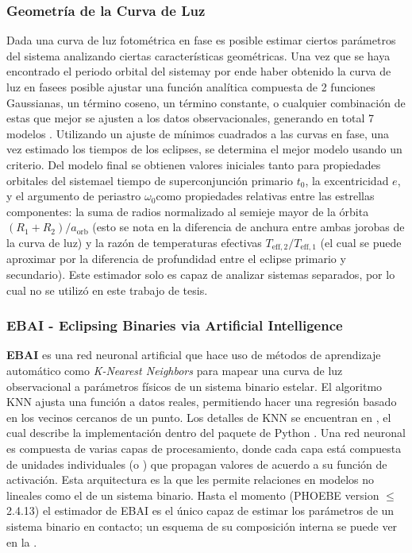 \subsubsection{Geometría de la Curva de Luz}
Dada una curva de luz fotométrica en fase es posible estimar ciertos parámetros
del sistema analizando ciertas características geométricas. Una vez que
se haya encontrado el periodo orbital del sistema\textemdash y por ende haber
obtenido la curva de luz en fase\textemdash es posible ajustar una función
analítica compuesta de 2 funciones Gaussianas, un término coseno, un término
constante, o cualquier combinación de estas que mejor se ajusten a los datos
observacionales, generando en total 7 modelos
. Utilizando un
ajuste de mínimos cuadrados a las curvas en fase, una vez estimado los tiempos
de los eclipses, se determina el mejor modelo usando un criterio. Del modelo
final se obtienen valores iniciales tanto para propiedades orbitales del
sistema\textemdash el tiempo de superconjunción primario $t_0$, la excentricidad
$e$, y el argumento de periastro $\omega_0$\textemdash como propiedades
relativas entre las estrellas componentes: la suma de radios normalizado al
semieje mayor de la órbita $(R_1 + R_2)/a_{\mathrm{orb}}$ (esto se nota en la
diferencia de anchura entre ambas jorobas de la curva de luz) y la razón de
temperaturas efectivas $T_{\mathrm{eff},2}/T_{\mathrm{eff},1}$ (el cual se puede
aproximar por la diferencia de profundidad entre el eclipse primario y
secundario). Este estimador solo es capaz de analizar sistemas separados, por lo
cual no se utilizó en este trabajo de tesis.

\subsubsection{EBAI - Eclipsing Binaries via Artificial Intelligence}
\textbf{EBAI} es una red neuronal artificial que hace uso de métodos de
aprendizaje automático como \textit{K-Nearest Neighbors} para mapear una curva
de luz observacional a parámetros físicos de un sistema binario estelar. El
algoritmo KNN ajusta una función a datos reales, permitiendo hacer una regresión
basado en los vecinos cercanos de un punto. Los detalles de KNN se encuentran en
, el cual describe la implementación
dentro del paquete de Python . Una red neuronal es compuesta
de varias capas de procesamiento, donde cada capa está compuesta de unidades
individuales (o ) que propagan valores de acuerdo a su función
de activación. Esta arquitectura es la que les permite 
relaciones en modelos no lineales como el de un sistema binario. Hasta el
momento (PHOEBE version $\leq$2.4.13) el estimador de EBAI es el único capaz de
estimar los parámetros de un sistema binario en contacto; un esquema de su
composición interna se puede ver en la .

